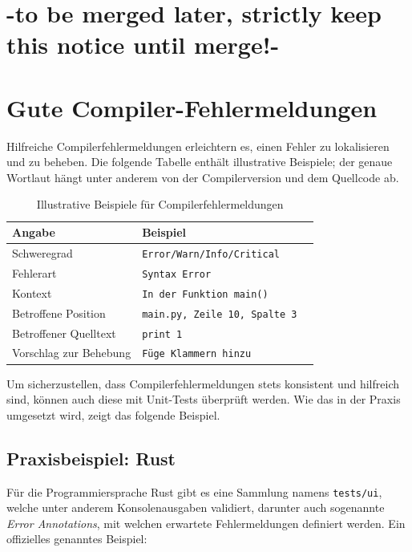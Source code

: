 \documentclass[a4paper,11pt]{article}
\begin{document}

\section{-to be merged later, strictly keep this notice until merge!-}

\section{Gute Compiler-Fehlermeldungen}

Hilfreiche Compilerfehlermeldungen erleichtern es, einen Fehler zu lokalisieren
und zu beheben. Die folgende Tabelle enthält illustrative Beispiele; der genaue
Wortlaut hängt unter anderem von der Compilerversion und dem Quellcode ab.

\begin{table}[htbp]
  \centering
  \caption{Illustrative Beispiele für Compilerfehlermeldungen}
  \label{tab:compiler-fehlermeldungen}
  \small
  \renewcommand{\arraystretch}{1.2}
  \begin{tabularx}{\linewidth}{@{}l>{\raggedright\arraybackslash}Xl@{}}
    \toprule
    \textbf{Angabe} & \textbf{Beispiel} \\
    \midrule
    Schweregrad & \texttt{Error/Warn/Info/Critical}  \\
    Fehlerart & \texttt{Syntax Error} \\
    Kontext & \texttt{In der Funktion main()} \\
    Betroffene Position & \texttt{main.py, Zeile 10, Spalte 3} \\
    Betroffener Quelltext & \texttt{print 1} \\
    Vorschlag zur Behebung & \texttt{Füge Klammern hinzu} \\
    \bottomrule
  \end{tabularx}
\end{table}

Um sicherzustellen, dass Compilerfehlermeldungen stets konsistent und hilfreich sind, können auch diese mit Unit-Tests überprüft werden. Wie das in der Praxis umgesetzt wird, zeigt das folgende Beispiel.

\subsection{Praxisbeispiel: Rust}

Für die Programmiersprache Rust gibt es eine Sammlung namens \texttt{tests/ui}, welche unter anderem Konsolenausgaben validiert, darunter auch sogenannte \emph{Error Annotations}, mit welchen erwartete Fehlermeldungen definiert werden. Ein offizielles genanntes Beispiel: \parencite{rust_ui_tests}
\end{document}
